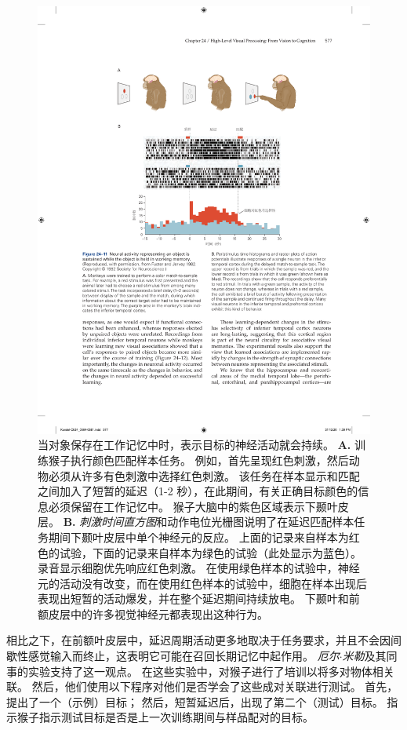 \begin{figure}[htbp]
	\centering
	\includegraphics[width=1.0\linewidth]{chap24/fig_24_11}
	\caption{当对象保存在工作记忆中时，表示目标的神经活动就会持续。 
		\textbf{A.} 训练猴子执行颜色匹配样本任务。
		例如，首先呈现红色刺激，然后动物必须从许多有色刺激中选择红色刺激。
		该任务在样本显示和匹配之间加入了短暂的延迟（1-2 秒），在此期间，有关正确目标颜色的信息必须保留在工作记忆中。
		猴子大脑中的紫色区域表示下颞叶皮层。
		\textbf{B.} \textit{刺激时间直方图}和动作电位光栅图说明了在延迟匹配样本任务期间下颞叶皮层中单个神经元的反应。
		上面的记录来自样本为红色的试验，下面的记录来自样本为绿色的试验（此处显示为蓝色）。
		录音显示细胞优先响应红色刺激。
		在使用绿色样本的试验中，神经元的活动没有改变，而在使用红色样本的试验中，细胞在样本出现后表现出短暂的活动爆发，并在整个延迟期间持续放电。
		下颞叶和前额皮层中的许多视觉神经元都表现出这种行为。}
	\label{fig:24_11}
\end{figure}


相比之下，在前额叶皮层中，延迟周期活动更多地取决于任务要求，并且不会因间歇性感觉输入而终止，这表明它可能在召回长期记忆中起作用。
\textit{厄尔$\cdot$米勒}及其同事的实验支持了这一观点。
在这些实验中，对猴子进行了培训以将多对物体相关联。 
然后，他们使用以下程序对他们是否学会了这些成对关联进行测试。
首先，提出了一个（示例）目标； 然后，短暂延迟后，出现了第二个（测试）目标。
指示猴子指示测试目标是否是上一次训练期间与样品配对的目标。


